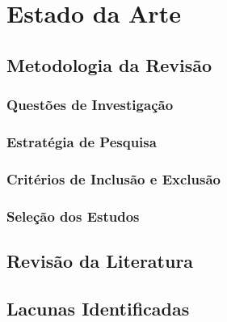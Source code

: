 \chapter{Estado da Arte}
\label{chap:estado_arte}


\section{Metodologia da Revisão}
\label{sec:estado_arte_metodologia}

\subsection*{Questões de Investigação}

\subsection*{Estratégia de Pesquisa}

\subsection*{Critérios de Inclusão e Exclusão}

\subsection*{Seleção dos Estudos}

\section{Revisão da Literatura}
\label{sec:estado_arte_revisao}

\section{Lacunas Identificadas}
\label{sec:estado_arte_lacunas}
